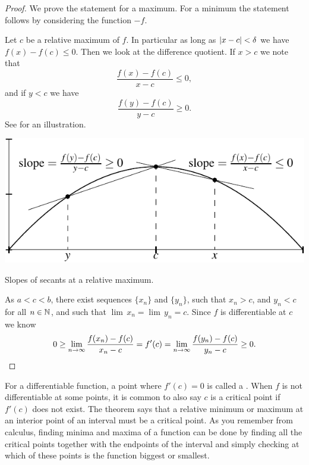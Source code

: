 \begin{proof}
We prove the statement for a maximum.  For a minimum the statement
follows by considering the function $-f$.

Let $c$ be a relative maximum of $f$.  In particular as long
as $\left\lvert {x-c} \right\rvert < \delta$ we have $f(x)-f(c) \leq 0$.
Then we look at the difference
quotient.  If $x > c$ we note that
\begin{equation*}
\frac{f(x)-f(c)}{x-c} \leq 0 ,
\end{equation*}
and if $y < c$ we have
\begin{equation*}
\frac{f(y)-f(c)}{y-c} \geq 0 .
\end{equation*}
See  for an illustration.
\begin{myfigureht}
\includegraphics{figures/critpt}
\caption{Slopes of secants at a relative maximum.\label{fig:critpt}}
\end{myfigureht}

As $a < c < b$, there exist
sequences $\{ x_n\}$ and $\{ y_n \}$, such
that $x_n > c$, and
$y_n < c$ for all $n \in {\mathbb{N}}$, and such that
 $\lim\, x_n = \lim\, y_n = c$.
Since $f$
is differentiable at $c$ we know 
\begin{equation*}
0 \geq \lim_{n\to\infty} \frac{f(x_n)-f(c)}{x_n-c} 
=
f'(c)
=
\lim_{n\to\infty} \frac{f(y_n)-f(c)}{y_n-c} \geq 0.  \qedhere
\end{equation*}
\end{proof}

For a differentiable function, a point where 
$f'(c) = 0$ is called a \emph{}.  When $f$ is not
differentiable at some points,
it is common to also say $c$ is a critical point
if $f'(c)$ does not exist.
The theorem says that a relative minimum or maximum at an interior point
of an interval must be a critical point.
As you remember from calculus, finding minima and maxima of a function can
be done by finding all the critical points together with the endpoints of
the interval and simply checking at which of these points
is the function biggest or smallest.

